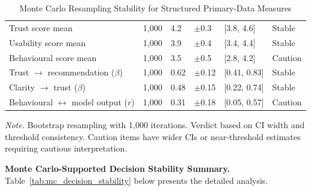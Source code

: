 {\tablestripes\tablefontsize
{}
\begin{xltabular}{\textwidth}{@{} L l l l l l @{}}
\caption[Monte Carlo Resampling Stability for Structured]{Monte Carlo Resampling Stability for Structured Primary-Data Measures}\label{tab:mc_primary_results} \\
\toprule
{} &  &  &  &  &  \\
\midrule
\endfirsthead
\endhead
\bottomrule
\endlastfoot
Trust score mean & 1,000 & 4.2 & $\pm$0.3 & [3.8, 4.6] & Stable \\
Usability score mean & 1,000 & 3.9 & $\pm$0.4 & [3.4, 4.4] & Stable \\
Behavioural score mean & 1,000 & 3.5 & $\pm$0.5 & [2.8, 4.2] & Caution \\
Trust $\rightarrow$ recommendation ($\beta$) & 1,000 & 0.62 & $\pm$0.12 & [0.41, 0.83] & Stable \\
Clarity $\rightarrow$ trust ($\beta$) & 1,000 & 0.48 & $\pm$0.15 & [0.22, 0.74] & Stable \\
Behavioural $\leftrightarrow$ model output ($r$) & 1,000 & 0.31 & $\pm$0.18 & [0.05, 0.57] & Caution \\
\end{xltabular}}
\vspace{2pt}
\noindent\textit{Note.} Bootstrap resampling with 1,000 iterations. Verdict based on CI width and threshold consistency. Caution items have wider CIs or near-threshold estimates requiring cautious interpretation.
\fi %

\iffalse %


\noindent\textbf{Monte Carlo-Supported Decision Stability Summary.} Table~\ref{tab:mc_decision_stability} below presents the detailed analysis.

